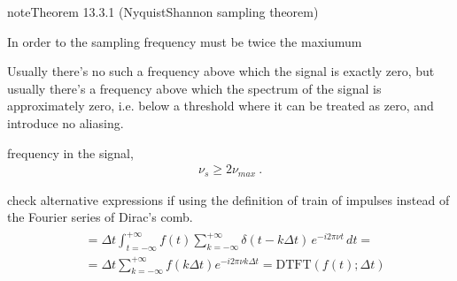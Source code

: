 \documentclass[letterpaper,10pt,english]{jupyterBook}
\begin{document}
\label{ch/complex/fourier-transforms:thm-shannon-nyquist}
\begin{sphinxadmonition}{note}{Theorem 13.3.1 (Nyquist\sphinxhyphen{}Shannon sampling theorem)}



\sphinxAtStartPar
In order to  the sampling frequency must be twice the maxiumum%
\begin{footnote}[1]\sphinxAtStartFootnote
Usually there’s no such a frequency above which the signal is exactly zero, but usually there’s a frequency above which the spectrum of the signal is approximately zero, i.e. below a threshold where it can be treated as zero, and introduce no aliasing.
%
\end{footnote} frequency in the signal,
\begin{equation*}
\begin{split}\nu_s \ge 2 \nu_{max} \ .\end{split}
\end{equation*}\end{sphinxadmonition}

\sphinxAtStartPar
{} check alternative expressions if using the definition of train of impulses instead of the Fourier series of Dirac’s comb.
\begin{equation}\label{equation:ch/complex/fourier-transforms:eq:dtft:2}
\begin{split}\begin{aligned}
 & = \Delta t \int_{t=-\infty}^{+\infty} f(t) \sum_{k=-\infty}^{+\infty} \delta(t - k \Delta t) \, e^{-i 2 \pi \nu t} \, dt = \\
 & = \Delta t \sum_{k=-\infty}^{+\infty} f(k \Delta t)  e^{-i 2 \pi \nu k \Delta t} = \text{DTFT}\left( f(t); \Delta t \right) 
\end{aligned}\end{split}
\end{equation}
\end{document}
